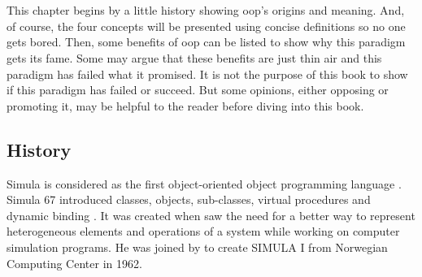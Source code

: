 \documentclass[12pt]{KodeBookAr}
\begin{document}
\fi

\chapter{}

\begin{introduction} %
	This chapter begins by a little history showing \ac{oop}'s origins and meaning.
	And, of course, the four concepts will be presented using concise definitions so no one gets bored.
	Then, some benefits of \ac{oop} can be listed to show why this paradigm gets its fame.
	Some may argue that these benefits are just thin air and this paradigm has failed what it promised.  
	It is not the purpose of this book to show if this paradigm has failed or succeed. 
	But some opinions, either opposing or promoting it, may be helpful to the reader before diving into this book.
\end{introduction}

\section{History}

Simula is considered as the first object-oriented object programming language \citep{2004-huang}.
Simula 67 introduced classes, objects, sub-classes, virtual procedures and dynamic binding \citep{2013-black}.
It was created when  saw the need for a better way to represent heterogeneous elements and operations of a system while working on computer simulation programs.
He was joined by  to create SIMULA I from Norwegian Computing Center in 1962.
\end{document}
